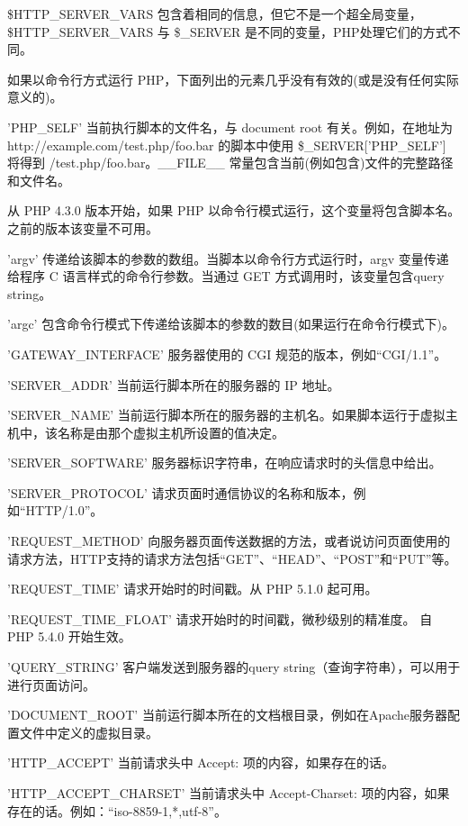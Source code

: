 \$HTTP\_SERVER\_VARS 包含着相同的信息，但它不是一个超全局变量，\$HTTP\_SERVER\_VARS 与 \$\_SERVER 是不同的变量，PHP处理它们的方式不同。


如果以命令行方式运行 PHP，下面列出的元素几乎没有有效的(或是没有任何实际意义的)。

\begin{compactitem}
\item 'PHP\_SELF'
当前执行脚本的文件名，与 document root 有关。例如，在地址为 http://example.com/test.php/foo.bar 的脚本中使用 \$\_SERVER['PHP\_SELF'] 将得到 /test.php/foo.bar。\_\_FILE\_\_ 常量包含当前(例如包含)文件的完整路径和文件名。 

从 PHP 4.3.0 版本开始，如果 PHP 以命令行模式运行，这个变量将包含脚本名。之前的版本该变量不可用。
\item 'argv'
传递给该脚本的参数的数组。当脚本以命令行方式运行时，argv 变量传递给程序 C 语言样式的命令行参数。当通过 GET 方式调用时，该变量包含query string。
\item 'argc'
包含命令行模式下传递给该脚本的参数的数目(如果运行在命令行模式下)。
\item 'GATEWAY\_INTERFACE'
服务器使用的 CGI 规范的版本，例如“CGI/1.1”。
\item 'SERVER\_ADDR'
当前运行脚本所在的服务器的 IP 地址。
\item 'SERVER\_NAME'
当前运行脚本所在的服务器的主机名。如果脚本运行于虚拟主机中，该名称是由那个虚拟主机所设置的值决定。
\item 'SERVER\_SOFTWARE'
服务器标识字符串，在响应请求时的头信息中给出。
\item 'SERVER\_PROTOCOL'
请求页面时通信协议的名称和版本，例如“HTTP/1.0”。
\item 'REQUEST\_METHOD'
向服务器页面传送数据的方法，或者说访问页面使用的请求方法，HTTP支持的请求方法包括“GET”、“HEAD”、“POST”和“PUT”等。
\item 'REQUEST\_TIME'
请求开始时的时间戳。从 PHP 5.1.0 起可用。
\item 'REQUEST\_TIME\_FLOAT'
请求开始时的时间戳，微秒级别的精准度。 自 PHP 5.4.0 开始生效。
\item 'QUERY\_STRING'
客户端发送到服务器的query string（查询字符串），可以用于进行页面访问。
\item 'DOCUMENT\_ROOT'
当前运行脚本所在的文档根目录，例如在Apache服务器配置文件中定义的虚拟目录。
\item 'HTTP\_ACCEPT'
当前请求头中 Accept: 项的内容，如果存在的话。
\item 'HTTP\_ACCEPT\_CHARSET'
当前请求头中 Accept-Charset: 项的内容，如果存在的话。例如：“iso-8859-1,*,utf-8”。

\end{compactitem}
